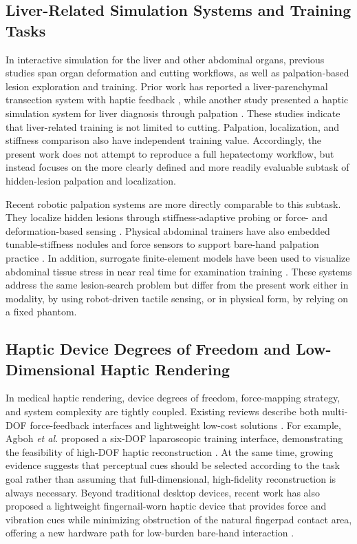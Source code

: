\documentclass{ieeeaccess}
\begin{document}
\subsection{Liver-Related Simulation Systems and Training Tasks}
In interactive simulation for the liver and other abdominal organs, previous studies span organ deformation and cutting workflows, as well as palpation-based lesion exploration and training. Prior work has reported a liver-parenchymal transection system with haptic feedback \cite{hongyu2021interactive}, while another study presented a haptic simulation system for liver diagnosis through palpation \cite{westwood2012haptic}. These studies indicate that liver-related training is not limited to cutting. Palpation, localization, and stiffness comparison also have independent training value. Accordingly, the present work does not attempt to reproduce a full hepatectomy workflow, but instead focuses on the more clearly defined and more readily evaluable subtask of hidden-lesion palpation and localization.

Recent robotic palpation systems are more directly comparable to this subtask. They localize hidden lesions through stiffness-adaptive probing or force- and deformation-based sensing \cite{fan2026stiffness,lee2025imagefree}. Physical abdominal trainers have also embedded tunable-stiffness nodules and force sensors to support bare-hand palpation practice \cite{he2021abdominal}. In addition, surrogate finite-element models have been used to visualize abdominal tissue stress in near real time for examination training \cite{leong2022surrogate}. These systems address the same lesion-search problem but differ from the present work either in modality, by using robot-driven tactile sensing, or in physical form, by relying on a fixed phantom.

\subsection{Haptic Device Degrees of Freedom and Low-Dimensional Haptic Rendering}
In medical haptic rendering, device degrees of freedom, force-mapping strategy, and system complexity are tightly coupled. Existing reviews describe both multi-DOF force-feedback interfaces and lightweight low-cost solutions \cite{overtoom2019haptic,rangarajan2020systematic,escobar2016review}. For example, Agboh \emph{et al.} proposed a six-DOF laparoscopic training interface, demonstrating the feasibility of high-DOF haptic reconstruction \cite{agboh2016six}. At the same time, growing evidence suggests that perceptual cues should be selected according to the task goal rather than assuming that full-dimensional, high-fidelity reconstruction is always necessary. Beyond traditional desktop devices, recent work has also proposed a lightweight fingernail-worn haptic device that provides force and vibration cues while minimizing obstruction of the natural fingerpad contact area, offering a new hardware path for low-burden bare-hand interaction \cite{xu2025lightweight}.
\end{document}
